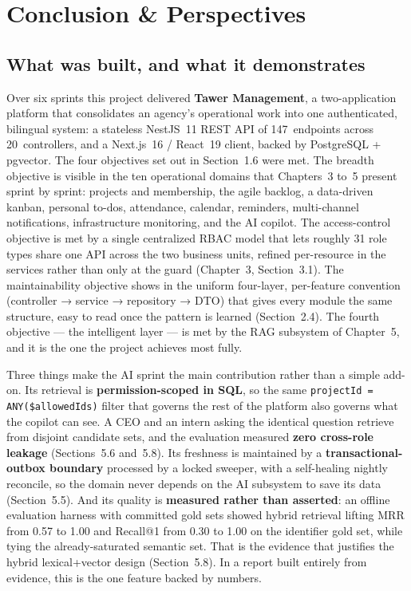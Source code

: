 \chapter*{Conclusion \& Perspectives}

\section*{What was built, and what it demonstrates}

Over six sprints this project delivered \textbf{Tawer Management}, a two-application platform that consolidates
an agency's operational work into one authenticated, bilingual system: a stateless NestJS~11 REST API of
147~endpoints across 20~controllers, and a Next.js~16 / React~19 client, backed by PostgreSQL + pgvector. The four objectives set out in Section~1.6 were met. The breadth objective is visible in
the ten operational domains that Chapters~3 to~5 present sprint by sprint: projects and membership,
the agile backlog, a data-driven kanban, personal to-dos, attendance, calendar, reminders, multi-channel
notifications, infrastructure monitoring, and the AI copilot. The access-control objective is met by a
single centralized RBAC model that lets roughly 31 role types share one API across the two business units,
refined per-resource in the services rather than only at the guard (Chapter~3, Section~3.1). The maintainability
objective shows in the uniform four-layer, per-feature convention (controller → service → repository →
DTO) that gives every module the same structure, easy to read once the pattern is learned (Section~2.4). The
fourth objective --- the intelligent layer --- is met by the RAG subsystem of Chapter~5, and it is the one the
project achieves most fully.

Three things make the AI sprint the main contribution rather than a simple add-on. Its retrieval is
\textbf{permission-scoped in SQL}, so the same \texttt{projectId = ANY(\$allowedIds)} filter that governs the rest of
the platform also governs what the copilot can see. A CEO and an intern asking the identical question
retrieve from disjoint candidate sets, and the evaluation measured \textbf{zero cross-role leakage} (Sections~5.6
and~5.8). Its freshness is maintained by a \textbf{transactional-outbox boundary} processed by a locked sweeper, with a
self-healing nightly reconcile, so the domain never depends on the AI subsystem to save its data (Section~5.5).
And its quality is \textbf{measured rather than asserted}: an offline evaluation harness with committed gold
sets showed hybrid retrieval lifting MRR from 0.57 to 1.00 and Recall@1 from 0.30 to 1.00 on the
identifier gold set, while tying the already-saturated semantic set. That is the evidence that justifies the
hybrid lexical+vector design (Section~5.8). In a report built entirely from evidence, this is the one
feature backed by numbers.

